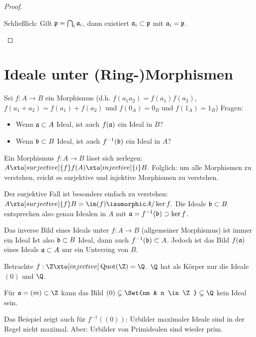 \begin{st}
\begin{proof}
\begin{enumerate}[(i)]
                Schließlich: Gilt $\mathfrak{p} = \bigcap_i {\mathfrak{a}}_i$, dann existiert ${\mathfrak{a}}_i \subset \mathfrak{p}$ mit ${\mathfrak{a}}_i = \mathfrak{p}$.
        \end{enumerate}
    \end{proof}
\end{st}



\section{Ideale unter (Ring-)Morphismen}


Sei $f: A \to B$ ein Morphismus (d.h. $f(a_1 a_2) = f(a_1) f(a_2)$, $f(a_1 + a_2) = f(a_1) + f(a_2)$ und $f(0_A) = 0_B$ und $f(1_A) = 1_B$)
Fragen:
\begin{itemize}
    \item
        Wenn $\mathfrak{a} \subset A$ Ideal, ist auch $f(\mathfrak{a})$ ein Ideal in $B$?
    \item
        Wenn $\mathfrak{b} \subset B$ Ideal, ist auch $f^{-1}(\mathfrak{b})$ ein Ideal in $A$?
\end{itemize}

\begin{nt}
    Ein Morphismus $f: A \to B$ lässt sich zerlegen:
    \begin{math}
        A \xto[surjective]{f} f(A)
        \xto[injective]{i} B.
    \end{math}
    Folglich: um alle Morphismen zu verstehen, reicht es surjektive und injektive Morphismen zu verstehen.

    Der surjektive Fall ist besonders einfach zu verstehen:
    \begin{math}
        A \xto[surjective]{f} B = \im(f) \isomorphic A / \ker f.
    \end{math}
    Die Ideale $\mathfrak{b} \subset B$ entsprechen also genau Idealen in $A$ mit $\mathfrak{a} = f^{-1}(\mathfrak{b}) \supset \ker f$.
\end{nt}

\begin{nt}
    Das inverse Bild eines Ideals unter $f: A \to B$ (allgemeiner Morphismus) ist immer ein Ideal
    Ist also $\mathfrak{b} \subset B$ Ideal, dann auch $f^{-1}(\mathfrak{b}) \subset A$.
    Jedoch ist das Bild $f(\mathfrak{a})$ eines Ideals $\mathfrak{a} \subset A$ nur ein Unterring von $B$.
\end{nt}

\begin{ex}
    Betrachte $f: \Z \xto[injective] \Quot(\Z) = \Q$.
    $\Q$ hat als Körper nur die Ideale $(0)$ und $\Q$.

    Für $\frk a = (m) \subset \Z$ kann das Bild $(0) \subsetneq \Set{nm & n \in \Z} \subsetneq \Q$ kein Ideal sein.

    Das Beispiel zeigt auch für $f^{-1}((0))$:
    Urbilder maximaler Ideale sind in der Regel nicht maximal.
    Aber: Urbilder von Primidealen sind wieder prim.
\end{ex}

